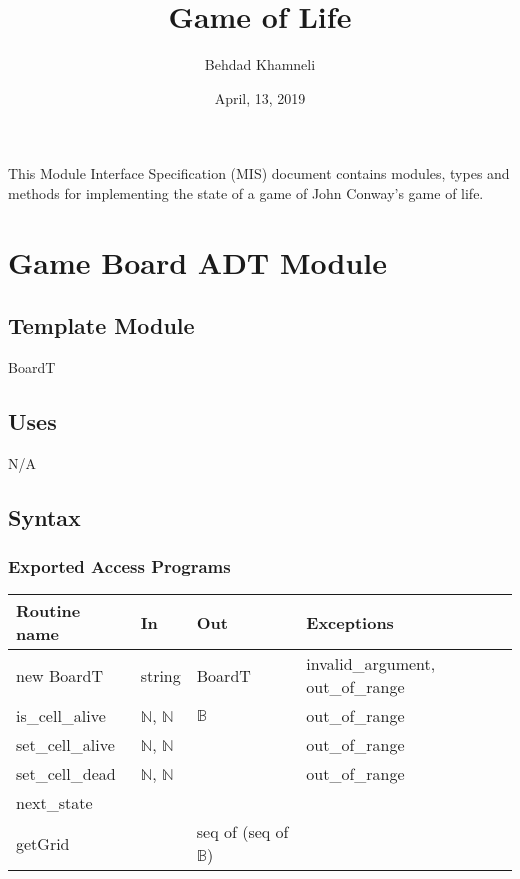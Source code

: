 \documentclass[12pt]{article}
\title{Game of Life}
\author{Behdad Khamneli}
\date{April, 13, 2019}
\begin{document}
\maketitle
This Module Interface Specification (MIS) document contains modules, types and
methods for implementing the state of a game of John Conway's game of life.

\newpage

\section* {Game Board ADT Module}

\subsection*{Template Module}

BoardT

\subsection* {Uses}

\noindent N/A

\subsection* {Syntax}

\subsubsection* {Exported Access Programs}

\begin{tabular}{| l | l | l | l |}
\hline
\textbf{Routine name} & \textbf{In} & \textbf{Out} & \textbf{Exceptions}\\
\hline
new BoardT  & string & BoardT & invalid\_argument, out\_of\_range\\
\hline
is\_cell\_alive & $\mathbb{N}$, $\mathbb{N}$ & $\mathbb{B}$ & out\_of\_range\\
\hline
set\_cell\_alive & $\mathbb{N}$, $\mathbb{N}$ &  &out\_of\_range\\
\hline
set\_cell\_dead & $\mathbb{N}$, $\mathbb{N}$ &  & out\_of\_range\\
\hline
next\_state & & &\\
\hline
getGrid & & seq of (seq of $\mathbb{B}$) & \\
\hline
\end{tabular}
\end{document}
